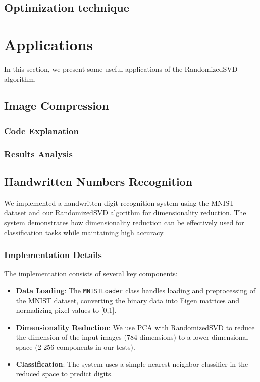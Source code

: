 \documentclass[11pt,a4paper]{article}
\begin{document}
\subsection{Optimization technique}

\section{Applications}
In this section, we present some useful applications of the RandomizedSVD algorithm.
\subsection{Image Compression}
\subsubsection{Code Explanation}
\subsubsection{Results Analysis}



\subsection{Handwritten Numbers Recognition}
We implemented a handwritten digit recognition system using the MNIST dataset and our RandomizedSVD algorithm for dimensionality reduction. The system demonstrates how dimensionality reduction can be effectively used for classification tasks while maintaining high accuracy.

\subsubsection{Implementation Details}
The implementation consists of several key components:

\begin{itemize}
    \item \textbf{Data Loading}: The \texttt{MNISTLoader} class handles loading and preprocessing of the MNIST dataset, converting the binary data into Eigen matrices and normalizing pixel values to [0,1].
    
    \item \textbf{Dimensionality Reduction}: We use PCA with RandomizedSVD to reduce the dimension of the input images (784 dimensions) to a lower-dimensional space (2-256 components in our tests).
    
    \item \textbf{Classification}: The system uses a simple nearest neighbor classifier in the reduced space to predict digits.
\end{itemize}
\end{document}
